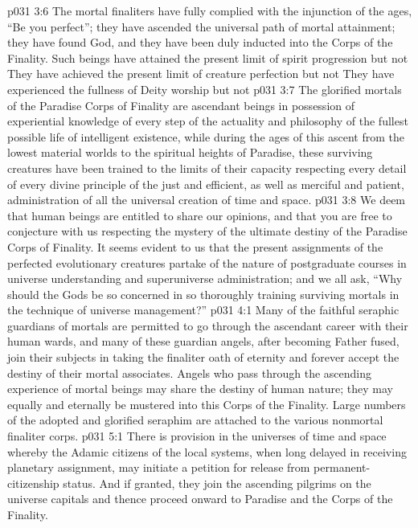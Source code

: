 \vs p031 3:6 \bibnobreakspace The mortal finaliters have fully complied with the injunction of the ages, “Be you perfect”; they have ascended the universal path of mortal attainment; they have found God, and they have been duly inducted into the Corps of the Finality. Such beings have attained the present limit of spirit progression but not  They have achieved the present limit of creature perfection but not  They have experienced the fullness of Deity worship but not 
\vs p031 3:7 \bibnobreakspace The glorified mortals of the Paradise Corps of Finality are ascendant beings in possession of experiential knowledge of every step of the actuality and philosophy of the fullest possible life of intelligent existence, while during the ages of this ascent from the lowest material worlds to the spiritual heights of Paradise, these surviving creatures have been trained to the limits of their capacity respecting every detail of every divine principle of the just and efficient, as well as merciful and patient, administration of all the universal creation of time and space.
\vs p031 3:8 \pc We deem that human beings are entitled to share our opinions, and that you are free to conjecture with us respecting the mystery of the ultimate destiny of the Paradise Corps of Finality. It seems evident to us that the present assignments of the perfected evolutionary creatures partake of the nature of postgraduate courses in universe understanding and superuniverse administration; and we all ask, “Why should the Gods be so concerned in so thoroughly training surviving mortals in the technique of universe management?”
\vs p031 4:1 Many of the faithful seraphic guardians of mortals are permitted to go through the ascendant career with their human wards, and many of these guardian angels, after becoming Father fused, join their subjects in taking the finaliter oath of eternity and forever accept the destiny of their mortal associates. Angels who pass through the ascending experience of mortal beings may share the destiny of human nature; they may equally and eternally be mustered into this Corps of the Finality. Large numbers of the adopted and glorified seraphim are attached to the various nonmortal finaliter corps.
\vs p031 5:1 There is provision in the universes of time and space whereby the Adamic citizens of the local systems, when long delayed in receiving planetary assignment, may initiate a petition for release from permanent\hyp{}citizenship status. And if granted, they join the ascending pilgrims on the universe capitals and thence proceed onward to Paradise and the Corps of the Finality.
